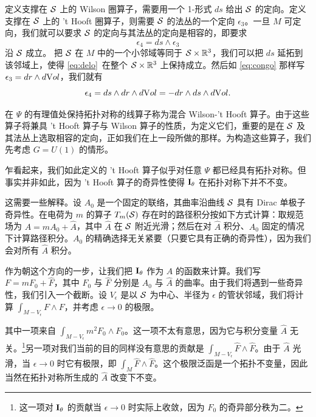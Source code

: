 定义支撑在 ${\cal S}$ 上的 Wilson 圈算子，需要用一个 1-形式 $ds$ 给出 ${\cal S}$ 的定向。定义支撑在 ${\cal S}$ 上的 't Hooft 圈算子，则需要 ${\cal S}$ 的法丛的一个定向 $\epsilon_3$。一旦 $M$ 可定向，我们就可以要求 ${\cal S}$ 的定向与其法丛的定向是相容的，即要求 %
\setcounter{equation}{10}
\begin{equation}\label{eq:delo}
\epsilon_4=ds\wedge \epsilon_3
\end{equation}
 沿 ${\cal S}$ 成立。
把 ${\cal S}$ 在 $M$ 中的一个小邻域等同于 ${\cal S}\times \Bbb{R}^3$，我们可以把 $ds$ 延拓到该邻域上，使得 \eqref{eq:delo}\ 在整个 ${\cal S}\times \Bbb{R}^3$ 上保持成立。然后如 \eqref{eq:congo} 那样写 $\epsilon_3=dr\wedge d{\rm Vol}$，我们就有 %
\setcounter{equation}{11}
\begin{equation}\label{eq:nelo}
\epsilon_4=ds\wedge dr\wedge d{\rm Vol}=-dr\wedge
ds\wedge d{\rm Vol}.
\end{equation}

在 $\Psi$ 的有理值处保持拓扑对称的线算子称为混合 Wilson-'t Hooft 算子。由于这些算子将兼具 't Hooft 算子与 Wilson 算子的性质，为定义它们，重要的是在 ${\cal S}$ 及其法丛上选取相容的定向，正如我们在上一段所做的那样。为构造这些算子，我们先考虑 $G=U(1)$ 的情形。

乍看起来，我们如此定义的 't Hooft 算子似乎对任意 $\Psi$ 都已经具有拓扑对称。但事实并非如此，因为 't Hooft 算子的奇异性使得 ${{\cmmib I}}_\theta$ 在拓扑对称下并不不变。

这需要一些解释。设 $A_0$ 是一个固定的联络，其曲率沿曲线 ${{\cal S}}$ 具有 Dirac 单极子奇异性。在电荷为 $m$ 的算子 $T_m({{\cal S}})$ 存在时的路径积分按如下方式计算：取规范场为 $A=mA_0+\hat A$，其中 $\hat A$ 在 ${{\cal S}}$ 附近光滑；然后在对 $\hat A$ 积分、$A_0$ 固定的情况下计算路径积分。$A_0$ 的精确选择无关紧要（只要它具有正确的奇异性），因为我们会对所有 $\hat A$ 积分。

作为朝这个方向的一步，让我们把 ${{\cmmib I}}_\theta$ 作为 $A$ 的函数来计算。我们写 $F=mF_0+\hat F$，其中 $F_0$ 与 $\hat F$ 分别是 $A_0$ 与 $\hat A$ 的曲率。由于我们将遇到一些奇异性，我们引入一个截断。设 $V_\epsilon$ 是以 ${{\cal S}}$ 为中心、半径为 $\epsilon$ 的管状邻域，我们将计算 $\int_{M-V_\epsilon} F\wedge F$，并考虑 $\epsilon\to 0$ 的极限。

其中一项来自 $\int_{M-V_\epsilon}m^2 F_0\wedge F_0$。这一项不太有意思，因为它与积分变量 $\hat A$ 无关。\footnote{这一项对 ${{\cmmib I}}_\theta$ 的贡献当 $\epsilon\to 0$ 时实际上收敛，因为 $F_0$ 的奇异部分秩为二。}另一项对我们当前的目的同样没有意思的贡献是 $\int_{M-V_\epsilon}\hat F\wedge \hat F$。由于 $\hat A$ 光滑，当 $\epsilon\to 0$ 时它有极限，即 $\int_M \hat F\wedge \hat F$。这个极限泛函是一个拓扑不变量，因此当然在拓扑对称所生成的 $\hat A$ 改变下不变。

